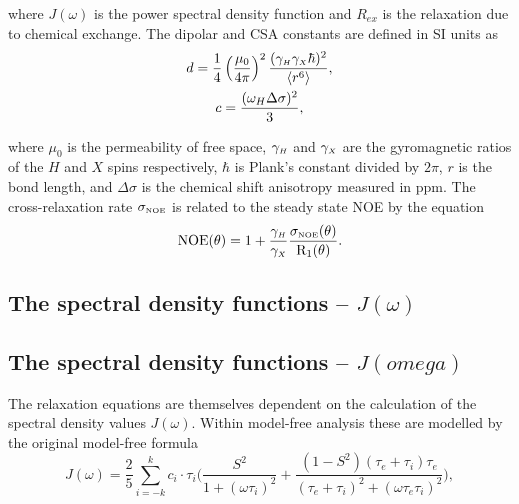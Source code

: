 \begin{htmlonly}
\begin{htmlonly}
\noindent where $J(\omega)$ is the power spectral density function and $R_{ex}$ is the relaxation due to chemical exchange.  The dipolar and CSA constants are defined in SI units as
\begin{gather}
 d = \frac{1}{4} \left(\frac{\mu_0}{4\pi}\right)^2 \frac{(\gamma_{\scriptscriptstyle H} \gamma_{\scriptscriptstyle X} \hbar)^2}{\langle r^6 \rangle}, \label{eq: dipolar constant} \\
 c = \frac{(\omega_H \Delta\sigma)^2}{3}, \label{eq: CSA constant}
\end{gather}

\noindent where $\mu_0$ is the permeability of free space, $\gamma_{\scriptscriptstyle H}$ and $\gamma_{\scriptscriptstyle X}$ are the gyromagnetic ratios of the $H$ and $X$ spins respectively, $\hbar$ is Plank's constant divided by $2\pi$, $r$ is the bond length, and $\Delta\sigma$ is the chemical shift anisotropy measured in ppm.  The cross-relaxation rate $\sigma_{\scriptscriptstyle \mathrm{NOE}}$ is related to the steady state NOE by the equation
\begin{equation} \label{eq: NOE}
 \mathrm{NOE}(\theta) = 1 + \frac{\gamma_{\scriptscriptstyle H}}{\gamma_{\scriptscriptstyle X}} \frac{\sigma_{\scriptscriptstyle \mathrm{NOE}}(\theta)}{\mathrm{R}_1(\theta)}.
\end{equation}



\begin{latexonly}
    \subsection{The spectral density functions -- $J(\omega)$}
\end{latexonly}
\begin{htmlonly}
    \subsection{The spectral density functions -- $J(omega)$}
\end{htmlonly}

The relaxation equations are themselves dependent on the calculation of the spectral density values $J(\omega)$.  Within model-free analysis these are modelled by the original model-free formula \citep{LipariSzabo82a, LipariSzabo82b}
\begin{equation} \label{eq: J(w) model-free generic}
    J(\omega) = \frac{2}{5} \sum_{i=-k}^k c_i \cdot \tau_i \Bigg(
        \frac{S^2}{1 + (\omega \tau_i)^2}
        + \frac{(1 - S^2)(\tau_e + \tau_i)\tau_e}{(\tau_e + \tau_i)^2 + (\omega \tau_e \tau_i)^2}
    \Bigg),
\end{equation}


\end{htmlonly}
\end{htmlonly}

